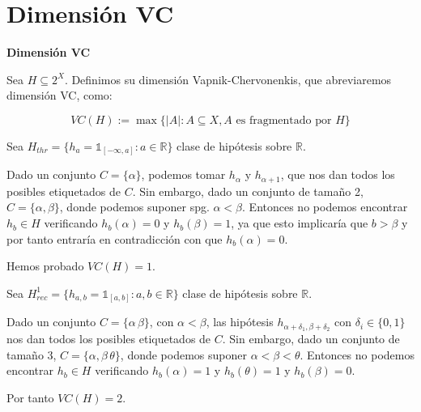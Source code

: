 \section{Dimensión VC}

\begin{definition}
\textbf{Dimensión VC}

Sea $H \subseteq 2^X$. Definimos su dimensión Vapnik-Chervonenkis, que abreviaremos dimensión VC, como:

\[VC(H) := \max \{|A| : A\subseteq X, A \textrm{ es fragmentado por } H\}\]
\end{definition}


\begin{example}

Sea $H_{thr} = \{h_a = \mathds{1}_{[-\infty, a]}: a\in \mathbb{R}\}$ clase de hipótesis sobre $\mathbb{R}$. 

Dado un conjunto $C=\{\alpha\}$, podemos tomar $h_{\alpha}$ y $h_{\alpha+1}$, que nos dan todos los posibles etiquetados de
$C$. Sin embargo, dado un conjunto de tamaño 2, $C=\{\alpha, \beta\}$, donde podemos suponer spg. $\alpha < \beta$. 
Entonces no podemos encontrar $h_b \in H$ verificando $h_b(\alpha)=0$ y $h_b(\beta) = 1$, ya que esto implicaría que 
$b > \beta$ y por tanto entraría en contradicción con que $h_b(\alpha) = 0$.

Hemos probado $VC(H) = 1$.

\end{example}

\begin{example}

Sea $H^1_{rec} = \{h_{a,b} = \mathds{1}_{[a,b]}: a,b\in \mathbb{R}\}$ clase de hipótesis sobre $\mathbb{R}$. 

Dado un conjunto $C=\{\alpha\, \beta\}$, con $\alpha < \beta$, las hipótesis $h_{\alpha+\delta_1, \beta + \delta_2}$ con 
$\delta_i \in \{0,1\}$ nos dan todos los posibles etiquetados de $C$. Sin embargo, dado un conjunto de tamaño 3, 
$C=\{\alpha, \beta\, \theta\}$, donde podemos suponer $\alpha < \beta < \theta$. Entonces no podemos encontrar $h_b \in H$ 
verificando $h_b(\alpha)=1$ y $h_b(\theta) = 1$ y $h_b(\beta) = 0$.

Por tanto $VC(H) = 2$.
\end{example}

